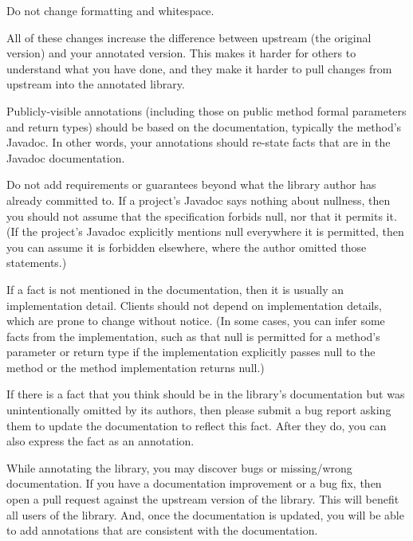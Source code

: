 Do not change formatting and whitespace.

All of these changes increase the difference between upstream (the original
version) and your annotated version.  This makes it harder for others to
understand what you have done, and they make it harder to pull changes from
upstream into the annotated library.



Publicly-visible annotations (including those on public method formal
parameters and return types) should be based on the
documentation, typically the method's Javadoc.
In other words, your annotations should re-state facts that are in the Javadoc
documentation.

Do not add requirements or guarantees beyond what the library author has
already committed to.  If a project's Javadoc says nothing about nullness,
then you should not assume that the specification forbids null, nor that it
permits it.
(If the project's Javadoc explicitly mentions null everywhere it is permitted,
then you can assume it is forbidden elsewhere, where the author omitted those
statements.)

If a fact is not mentioned in the documentation, then it is usually an
implementation detail.  Clients should not depend on implementation
details, which are prone to change without notice.
(In some cases, you can infer some facts from the
implementation, such as that null is permitted for a method's parameter or
return type if the implementation explicitly passes null to the method or
the method implementation returns null.)

If there is a fact that you think should be in the library's documentation
but was unintentionally omitted by its authors, then please submit a bug
report asking them to update the documentation to reflect this fact.  After
they do, you can also express the fact as an annotation.




While annotating the library, you may discover bugs or missing/wrong
documentation.  If you have a documentation improvement or a bug fix, then
open a pull request against the upstream version of the library.  This will
benefit all users of the library.  And, once the documentation is updated,
you will be able to add annotations that are consistent with the
documentation.


